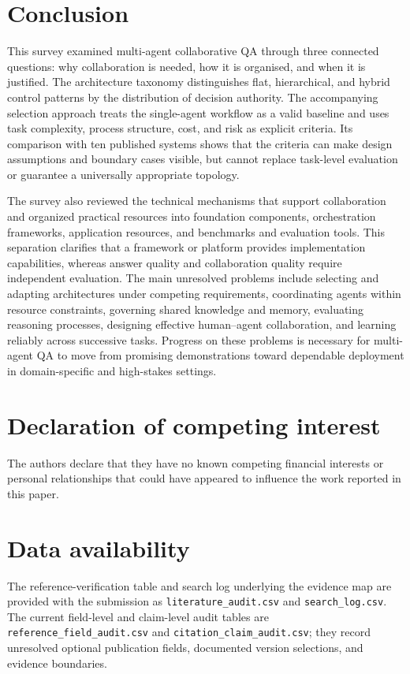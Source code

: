 \documentclass[a4paper,fleqn]{cas-dc}
\begin{document}
\section{Conclusion}
\label{sec:conclusion}

This survey examined multi-agent collaborative QA through three connected
questions: why collaboration is needed, how it is organised, and when it is
justified. The architecture taxonomy distinguishes flat, hierarchical, and
hybrid control patterns by the distribution of decision authority. The
accompanying selection approach treats the single-agent workflow as a valid
baseline and uses task complexity, process structure, cost, and risk as
explicit criteria. Its comparison with ten published systems shows that the
criteria can make design assumptions and boundary cases visible, but cannot
replace task-level evaluation or guarantee a universally appropriate topology.

The survey also reviewed the technical mechanisms that support collaboration
and organized practical resources into foundation components, orchestration
frameworks, application resources, and benchmarks and evaluation tools. This
separation clarifies that a framework or platform provides implementation
capabilities, whereas answer quality and collaboration quality require
independent evaluation. The main unresolved problems include selecting and
adapting architectures under competing requirements, coordinating agents
within resource constraints, governing shared knowledge and memory, evaluating
reasoning processes, designing effective human--agent collaboration, and
learning reliably across successive tasks. Progress on these problems is
necessary for multi-agent QA to move from
promising demonstrations toward dependable deployment in domain-specific and
high-stakes settings.

\section*{Declaration of competing interest}
The authors declare that they have no known competing financial interests
or personal relationships that could have appeared to influence the work
reported in this paper.

\section*{Data availability}
The reference-verification table and search log underlying the evidence map
are provided with the submission as \texttt{literature\_audit.csv} and
\texttt{search\_log.csv}. The current field-level and claim-level audit tables
are \texttt{reference\_field\_audit.csv} and
\texttt{citation\_claim\_audit.csv}; they record unresolved
optional publication fields, documented version selections, and evidence boundaries.
\end{document}
